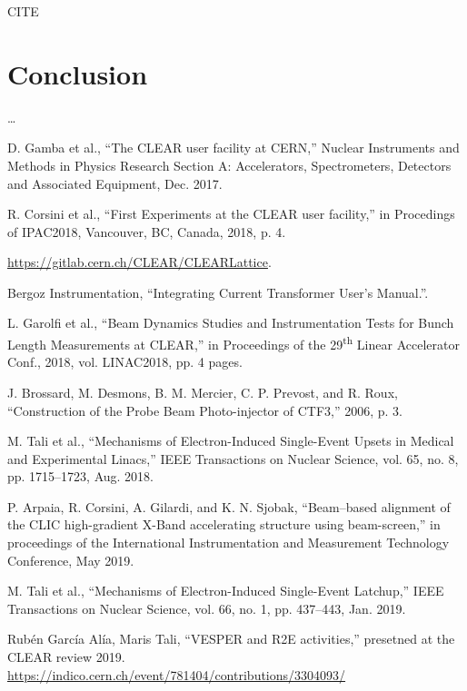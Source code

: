 \documentclass[a4paper,
               keeplastbox,   %
               ]{jacow}
\begin{document}
CITE~\cite{Roberto::CLEARrev}

\section{Conclusion}

\ldots

\begin{thebibliography}{99}
 D. Gamba et al., “The CLEAR user facility at CERN,” Nuclear Instruments and Methods in Physics Research Section A: Accelerators, Spectrometers, Detectors and Associated Equipment, Dec. 2017.

 R. Corsini et al., “First Experiments at the CLEAR user facility,” in Procedings of IPAC2018, Vancouver, BC, Canada, 2018, p. 4.

 \url{https://gitlab.cern.ch/CLEAR/CLEARLattice}.

 Bergoz Instrumentation, “Integrating Current Transformer User’s Manual.”.

 L. Garolfi et al., “Beam Dynamics Studies and Instrumentation Tests for Bunch Length Measurements at CLEAR,” in Proceedings of the 29\textsuperscript{th} Linear Accelerator Conf., 2018, vol. LINAC2018, pp. 4 pages.

 J. Brossard, M. Desmons, B. M. Mercier, C. P. Prevost, and R. Roux, “Construction of the Probe Beam Photo-injector of CTF3,” 2006, p. 3.

 M. Tali et al., “Mechanisms of Electron-Induced Single-Event Upsets in Medical and Experimental Linacs,” IEEE Transactions on Nuclear Science, vol. 65, no. 8, pp. 1715–1723, Aug. 2018.

 P. Arpaia, R. Corsini, A. Gilardi, and K. N. Sjobak, “Beam–based alignment of the CLIC high-gradient X-Band accelerating structure using beam-screen,” in proceedings of the International Instrumentation and Measurement Technology Conference, May 2019.

 M. Tali et al., “Mechanisms of Electron-Induced Single-Event Latchup,” IEEE Transactions on Nuclear Science, vol. 66, no. 1, pp. 437–443, Jan. 2019.

 Rubén García Alía, Maris Tali, ``VESPER and R2E activities,'' presetned at the CLEAR review 2019. \url{https://indico.cern.ch/event/781404/contributions/3304093/}


\end{thebibliography}
\end{document}
